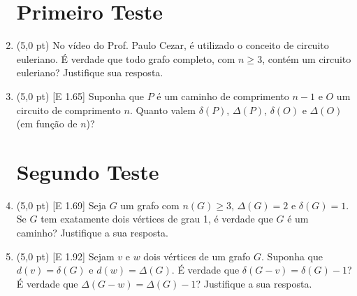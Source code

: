 \documentclass[12pt,a4paper,oneside]{article}
\begin{document}
\begin{enumerate}

	\section*{Primeiro Teste}

	\item (5,0 pt) No vídeo do Prof. Paulo Cezar, é utilizado o conceito de circuito euleriano. É verdade que todo grafo completo, com $n \geq 3$, contém um circuito euleriano? Justifique sua resposta.
	
	\item (5,0 pt) [E 1.65] Suponha que $P$ é um caminho de comprimento $n-1$ e $O$ um circuito de comprimento $n$. Quanto valem $\delta(P)$, $\Delta(P)$, $\delta(O)$ e $\Delta(O)$ (em função de $n$)?
	
	\section*{Segundo Teste}

	\item (5,0 pt) [E 1.69] Seja $G$ um grafo com $n(G) \geq 3$, $\Delta(G) = 2$ e $\delta(G) = 1$. Se $G$ tem
exatamente dois vértices de grau 1, é verdade que $G$ é um caminho? Justifique a sua resposta.

	\item (5,0 pt) [E 1.92] Sejam $v$ e $w$ dois vértices de um grafo $G$. Suponha que $d(v) = \delta(G)$ e $d(w) = \Delta(G)$. É verdade que $\delta(G-v) = \delta(G)-1$? É verdade que $\Delta(G-w) = \Delta(G) - 1$? Justifique a sua resposta.
	
	\end{enumerate}
\end{document}
